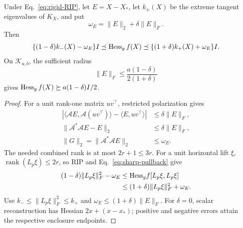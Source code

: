 \begin{theorem}
\label{thm:rigid-rip-hessian}
Under Eq.~\eqref{eq:rigid-RIP}, let $E=X-X_*$, let
$k_\pm(X)$ be the extreme tangent eigenvalues of $K_X$, and put
\begin{equation}
\omega_E=\|E\|_2+\delta\|E\|_F .
\end{equation}
Then
\begin{equation}
\{(1-\delta)k_-(X)-\omega_E\}I
\preceq\operatorname{Hess}_g f(X)
\preceq\{(1+\delta)k_+(X)+\omega_E\}I .
\label{eq:rigid-rip-hessian}
\end{equation}
On $\mathcal K_{a,b}$, the sufficient radius
\begin{equation}
\|E\|_F\leq\frac{a(1-\delta)}{2(1+\delta)}
\end{equation}
gives $\operatorname{Hess}_g f(X)\succeq a(1-\delta)I/2$.
\end{theorem}
\begin{proof}
For a unit rank-one matrix $uv^\top$, restricted polarization gives
\begin{align}
|\langle\mathcal AE,\mathcal A(uv^\top)\rangle
-\langle E,uv^\top\rangle|
&\leq\delta\|E\|_F,\\
\|\mathcal A^*\mathcal AE-E\|_2&\leq\delta\|E\|_F,\\
\|G\|_2=\|\mathcal A^*\mathcal AE\|_2&\leq\omega_E .
\end{align}
The needed combined rank is at most $2r+1\leq3r$.
For a unit horizontal lift $\xi$, $\operatorname{rank}(L_p\xi)\leq2r$,
so RIP and Eq.~\eqref{eq:sharp-pullback} give
\begin{align}
(1-\delta)\|L_p\xi\|_F^2-\omega_E
&\leq{\rm Hess}_g f[L_p\xi,L_p\xi]\\
&\leq(1+\delta)\|L_p\xi\|_F^2+\omega_E .
\end{align}
Use $k_-\leq\|L_p\xi\|_F^2\leq k_+$ and
$\omega_E\leq(1+\delta)\|E\|_F$.
For $\delta=0$, scalar reconstruction has Hessian $2x+(x-x_*)$;
positive and negative errors attain the respective enclosure endpoints.
\end{proof}

